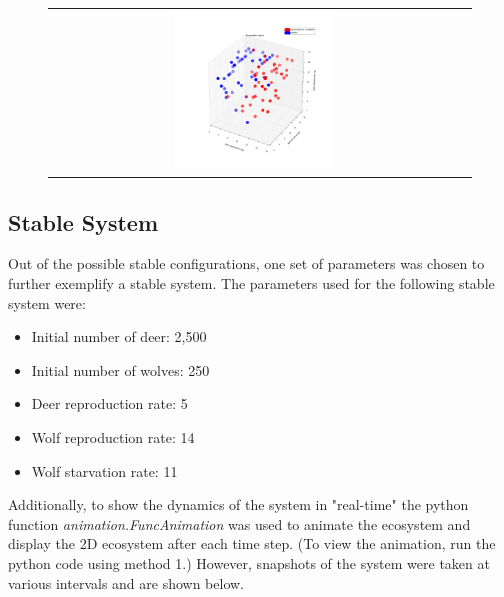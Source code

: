 \documentclass[a4paper,12pt]{article}
\begin{document}
\begin{figure}[H]
\begin{tabular}{@{}cc@{}}
        	\includegraphics[width = 0.4\textwidth]{./pics/Restricted_Parameter_space_d250_w2500.png} \\
	\end{tabular}
        \label{RestrictParam}
  \end{figure}

\subsection{Stable System}
\indent
\indent Out of the possible stable configurations, one set of parameters was chosen to further exemplify a stable system.  The parameters used for the following 
stable system were:
\begin{itemize}
  \item{Initial number of deer: 2,500}
  \item{Initial number of wolves: 250}
  \item{Deer reproduction rate: 5}
  \item{Wolf reproduction rate: 14}
  \item{Wolf starvation rate: 11}
  \end{itemize}
Additionally, to show the dynamics of the system in "real-time" the python function \textit{
animation.FuncAnimation} was used to animate the ecosystem and display the 2D ecosystem after each time step.  (To view the animation, run the python code using 
method 1.)  However, snapshots of the system were taken at various intervals and are shown below.
\end{document}

